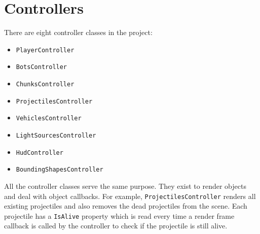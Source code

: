 \section{Controllers}

There are eight controller classes in the project:

\begin{itemize}
  \item  \texttt{PlayerController}
  \item \texttt{BotsController} 
  \item \texttt{ChunksController}
  \item \texttt{ProjectilesController}
  \item \texttt{VehiclesController}
  \item \texttt{LightSourcesController}
  \item \texttt{HudController}
  \item \texttt{BoundingShapesController}
\end{itemize}

All the controller classes serve the same purpose.
They exist to render objects and deal with object callbacks.
For example, \texttt{ProjectilesController} renders all existing projectiles and also removes the dead projectiles from the scene.
Each projectile has a \texttt{IsAlive} property which is read every time a render frame callback is called by the controller to check if the projectile is still alive.
